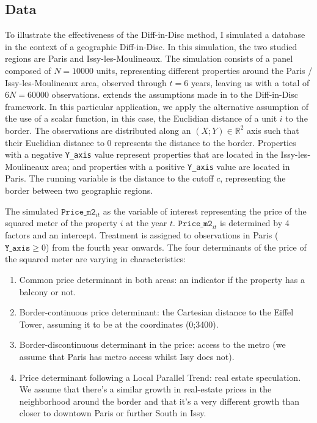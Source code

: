 \documentclass[12pt]{article}
\theoremstyle{plain}
\theoremstyle{remark}
\def\code#1{\texttt{#1}}
\begin{document}
\subsection{Data}
To illustrate the effectiveness of the Diff-in-Disc method, I simulated a database in the context of a geographic Diff-in-Disc. In this simulation, the two studied regions are Paris and Issy-les-Moulineaux. The simulation consists of a panel composed of $N=10 000$ units, representing different properties around the Paris / Issy-les-Moulineaux area, observed through $t=6$ years, leaving us with a total of $6N=60 000$ observations. \textcite{Butts_2023} extends the assumptions made in \textcite{Keele_Titiunik_2015} to the Diff-in-Disc framework. In this particular application, we apply the alternative assumption of the use of a scalar function, in this case, the Euclidian distance of a unit $i$ to the border. The observations are distributed along an $(X;Y)\in\mathbb{R}^2$ axis such that their Euclidian distance to 0 represents the distance to the border. Properties with a negative \code{Y\_axis} value represent properties that are located in the Issy-les-Moulineaux area; and properties with a positive \code{Y\_axis} value are located in Paris. The running variable is the distance to the cutoff $c$, representing the border between two geographic regions.

The simulated  $\code{Price\_m2}_{it}$ as the variable of interest representing the price of the squared meter of the property $i$ at the year $t$. $\code{Price\_m2}_{it}$ is determined by 4 factors and an intercept. Treatment is assigned to observations in Paris ($\code{Y\_axis}\geq 0$) from the fourth year onwards. The four determinants of the price of the squared meter are varying in characteristics: 

\begin{enumerate}
    \item Common price determinant in both areas: an indicator if the property has a balcony or not. 
    \item Border-continuous price determinant: the Cartesian distance to the Eiffel Tower, assuming it to be at the coordinates (0;3400).
    \item Border-discontinuous determinant in the price: access to the metro (we assume that Paris has metro access whilst Issy does not).
    \item Price determinant following a Local Parallel Trend: real estate speculation. We assume that there's a similar growth in real-estate prices in the neighborhood around the border and that it's a very different growth than closer to downtown Paris or further South in Issy.
\end{enumerate}
\end{document}
